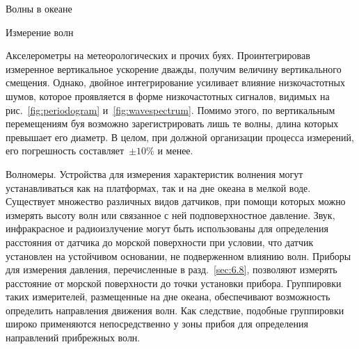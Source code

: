 \begin{chapter}{Волны в океане}
\begin{section}{Измерение волн}
\begin{paragraph}{Акселерометры на метеорологических и прочих буях.}
Проинтегрировав измеренное вертикальное ускорение дважды, получим величину
вертикального смещения. Однако, двойное интегрирование усиливает влияние
низкочастотных шумов, которое проявляется в форме низкочастотных сигналов,
видимых на рис.~\ref{fig:periodogram} и~\ref{fig:wavespectrum}. Помимо этого,
по вертикальным перемещениям буя возможно зарегистрировать лишь те волны, 
длина которых превышает его диаметр. В целом, при должной организации
процесса измерений, его погрешность составляет~$\pm 10\%$ и менее.
%
\end{paragraph}

\begin{paragraph}{Волномеры.} 
Устройства для измерения характеристик волнения 
могут устанавливаться как на платформах, так и на дне океана в мелкой воде.
Существует множество различных видов датчиков, при помощи которых можно
измерять высоту волн или связанное с ней подповерхностное давление.
Звук, инфракрасное и радиоизлучение могут быть использованы для определения
расстояния от датчика до морской поверхности при условии, что датчик 
установлен на устойчивом основании, не подверженном влиянию волн.
Приборы для измерения давления, перечисленные в разд.~\ref{sec:6.8},
позволяют измерять расстояние от морской поверхности до точки установки
прибора. Группировки таких измерителей, размещенные на дне океана,
обеспечивают возможность определить направления движения волн. Как
следствие, подобные группировки широко применяются непосредственно у
зоны прибоя для определения направлений прибрежных волн.
%


\end{paragraph}
\end{section}
\end{chapter}
